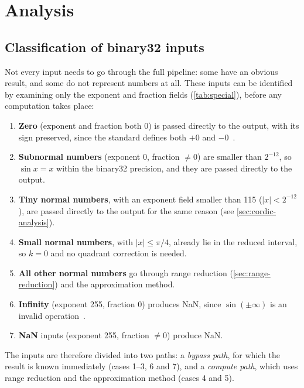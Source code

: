 
\chapter{Analysis}
\label{ch:analysis}

\section{Classification of binary32 inputs}
\label{sec:input-classification}
Not every input needs to go through the full pipeline: some have an obvious
result, and some do not represent numbers at all. These inputs can be
identified by examining only the exponent and fraction fields
(\cref{tab:special}), before any computation takes place:

\begin{enumerate}[label=\textbf{\arabic*.}, ref=\arabic*, leftmargin=*]
  \item \textbf{Zero} (exponent and fraction both 0) is passed directly to
    the output, with its sign preserved, since the standard defines both
    $+0$ and $-0$~\cite{ieee754}.
  \item \textbf{Subnormal numbers} (exponent 0, fraction $\neq 0$) are
    smaller than $2^{-12}$, so $\sin x = x$ within the binary32
    precision, and they are passed directly to the output.
  \item \textbf{Tiny normal numbers}, with an exponent field smaller than 115
    ($|x| < 2^{-12}$), are passed directly to the output for the same
    reason (see \cref{sec:cordic-analysis}).
  \item \textbf{Small normal numbers}, with $|x| \le \pi/4$, already lie in
    the reduced interval, so $k = 0$ and no quadrant correction is
    needed.
  \item \textbf{All other normal numbers} go through range reduction (\cref{sec:range-reduction})
    and the approximation method.
  \item \textbf{Infinity} (exponent 255, fraction 0) produces NaN, since
    $\sin(\pm\infty)$ is an invalid operation~\cite{ieee754}.
  \item \textbf{NaN} inputs (exponent 255, fraction $\neq 0$) produce NaN.
\end{enumerate}

The inputs are therefore divided into two paths: a \emph{bypass path}, for
which the result is known immediately (cases 1--3, 6 and 7), and a
\emph{compute path}, which uses range reduction and the approximation method
(cases 4 and 5).

